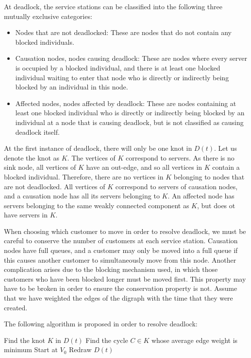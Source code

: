 \documentclass{article}
\begin{document}
At deadlock, the service stations can be classified into the following three mutually exclusive categories:
\begin{itemize}
    \item Nodes that are not deadlocked: These are nodes that do not contain any blocked individuals.
    \item Causation nodes, nodes causing deadlock: These are nodes where every server is occupied by a blocked individual, and there is at least one blocked individual waiting to enter that node who is directly or indirectly being blocked by an individual in this node.
    \item Affected nodes, nodes affected by deadlock: These are nodes containing at least one blocked individual who is directly or indirectly being blocked by an individual at a node that is causing deadlock, but is not classified as causing deadlock itself.
\end{itemize}

At the first instance of deadlock, there will only be one knot in $D(t)$.
Let us denote the knot as $K$.
The vertices of $K$ correspond to servers.
As there is no sink node, all vertices of $K$ have an out-edge, and so all vertices in $K$ contain a blocked individual.
Therefore, there are no vertices in $K$ belonging to nodes that are not deadlocked.
All vertices of $K$ correspond to servers of causation nodes, and a causation node has all its servers belonging to $K$.
An affected node has servers belonging to the same weakly connected component as $K$, but does ot have servers in $K$.

When choosing which customer to move in order to resolve deadlock, we must be careful to conserve the number of customers at each service station.
Causation nodes have full queues, and a customer may only be moved into a full queue if this causes another customer to simultaneously move from this node.
Another complication arises due to the blocking mechanism used, in which those customers who have been blocked longer must be moved first.
This property may have to be broken in order to ensure the conservation property is not.
Assume that we have weighted the edges of the digraph with the time that they were created. %

The following algorithm is proposed in order to resolve deadlock:

\begin{algorithm}[H]
    \DontPrintSemicolon
    Find the knot $K$ in $D(t)$\;
    Find the cycle $C \in K$ whose average edge weight is minimum\;
    Start at $V_0$\;
    Redraw $D(t)$\;
\end{algorithm}





\end{document}
